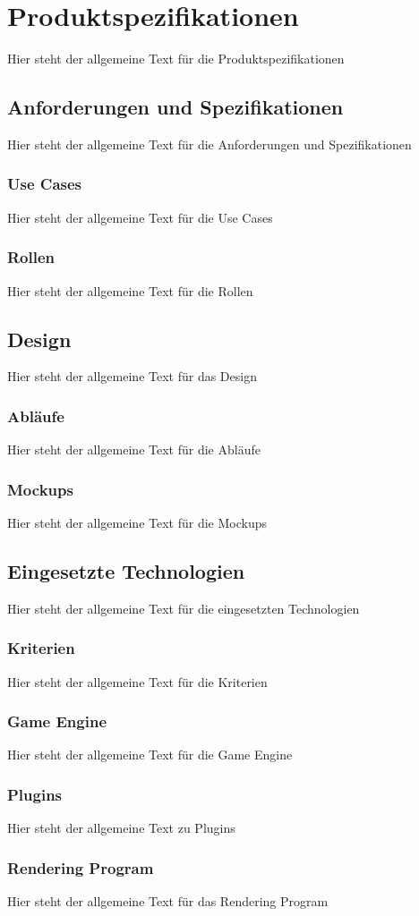 \chapter{Produktspezifikationen}
Hier steht der allgemeine Text für die Produktspezifikationen

\section{Anforderungen und Spezifikationen}
Hier steht der allgemeine Text für die Anforderungen und Spezifikationen

\subsection{Use Cases}
Hier steht der allgemeine Text für die Use Cases

\subsection{Rollen}
Hier steht der allgemeine Text für die Rollen

\section{Design}
Hier steht der allgemeine Text für das Design

\subsection{Abläufe}
Hier steht der allgemeine Text für die Abläufe

\subsection{Mockups}
Hier steht der allgemeine Text für die Mockups

\section{Eingesetzte Technologien}
Hier steht der allgemeine Text für die eingesetzten Technologien

\subsection{Kriterien}
Hier steht der allgemeine Text für die Kriterien

\subsection{Game Engine}
Hier steht der allgemeine Text für die Game Engine

\subsection{Plugins}
Hier steht der allgemeine Text zu Plugins

\subsection{Rendering Program}
Hier steht der allgemeine Text für das Rendering Program
 
